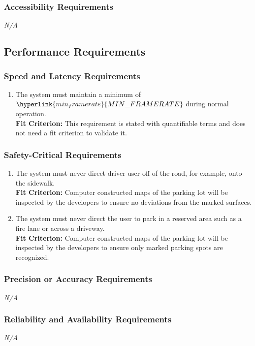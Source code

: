 \documentclass[12pt,letterpaper]{article}
\begin{document}
\subsubsection{Accessibility Requirements}
\noindent \emph{N/A}

\subsection{Performance Requirements}
\subsubsection{Speed and Latency Requirements}
\begin{enumerate}[{PE}1.] 
    \item The system must maintain a minimum of
    $\hyperlink{min_framerate}{MIN\_FRAMERATE}$ during normal operation.\\
    \textbf{Fit Criterion:} This requirement is stated with quantifiable terms
    and does not need a fit criterion to validate it. 
\end{enumerate}

\subsubsection{Safety-Critical Requirements}
\begin{enumerate}[resume*] 
    \item The system must never direct driver user off of the road, for example,
    onto the sidewalk.\\
    \textbf{Fit Criterion:} Computer constructed maps of the parking lot will be
    inspected by the developers to ensure no deviations from the marked
    surfaces.
    \item The system must never direct the user to park in a reserved area such
    as a fire lane or across a driveway.\\
    \textbf{Fit Criterion:} Computer constructed maps of the parking lot will be
    inspected by the developers to ensure only marked parking spots are
    recognized.
\end{enumerate}

\subsubsection{Precision or Accuracy Requirements}
\noindent \emph{N/A}

\subsubsection{Reliability and Availability Requirements}
\noindent \emph{N/A}
\end{document}
